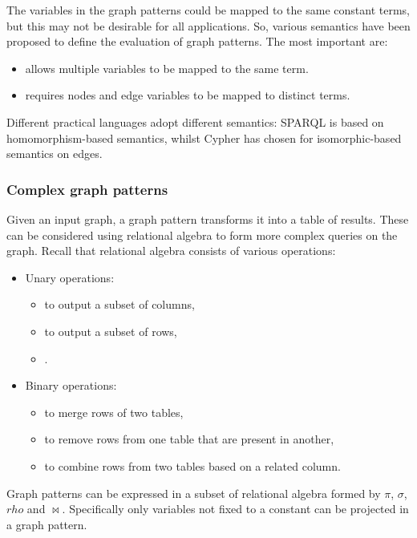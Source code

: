 The variables in the graph patterns could be mapped to the same constant terms, but this may not be desirable for all applications. So, various semantics have been proposed to define the evaluation of graph patterns. The most important are:
\begin{itemize}
    \item{} allows multiple variables to be mapped to the same term.
    \item{} requires nodes and edge variables to be mapped to distinct terms. 
\end{itemize}
Different practical languages adopt different semantics: SPARQL is based on homomorphism-based semantics, whilst Cypher has chosen for isomorphic-based semantics on edges.

\subsubsection{Complex graph patterns}
Given an input graph, a graph pattern transforms it into a table of results. These can be considered using relational algebra to form more complex queries on the graph. Recall that relational algebra consists of various operations:
\begin{itemize}
    \item Unary operations:
    \begin{itemize}
        \item {} to output a subset of columns,
        \item {} to output a subset of rows,
        \item {}.
    \end{itemize}
    \item Binary operations:
    \begin{itemize}
        \item {} to merge rows of two tables,
        \item {} to remove rows from one table that are present in another,
        \item {} to combine rows from two tables based on a related column.
    \end{itemize}
\end{itemize}
Graph patterns can be expressed in a subset of relational algebra formed by $\pi$, $\sigma$, $rho$ and $\bowtie$. Specifically only variables not fixed to a constant can be projected in a graph pattern.


